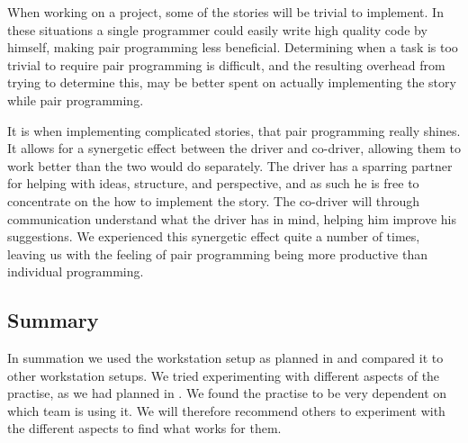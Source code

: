 When working on a project, some of the stories will be trivial to implement.
In these situations a single programmer could easily write high quality code by himself, making pair programming less beneficial.
Determining when a task is too trivial to require pair programming is difficult, and the resulting overhead from trying to determine this, may be better spent on actually implementing the story while pair programming.

It is when implementing complicated stories, that pair programming really shines.
It allows for a synergetic effect between the driver and co-driver, allowing them to work better than the two would do separately.
The driver has a sparring partner for helping with ideas, structure, and perspective, and as such he is free to concentrate on the how to implement the story.
The co-driver will through communication understand what the driver has in mind, helping him improve his suggestions.
We experienced this synergetic effect quite a number of times, leaving us with the feeling of pair programming being more productive than individual programming.

\subsection{Summary}
In summation we used the workstation setup as planned in  and compared it to other workstation setups.
We tried experimenting with different aspects of the practise, as we had planned in .
We found the practise to be very dependent on which team is using it.
We will therefore recommend others to experiment with the different aspects to find what works for them.

